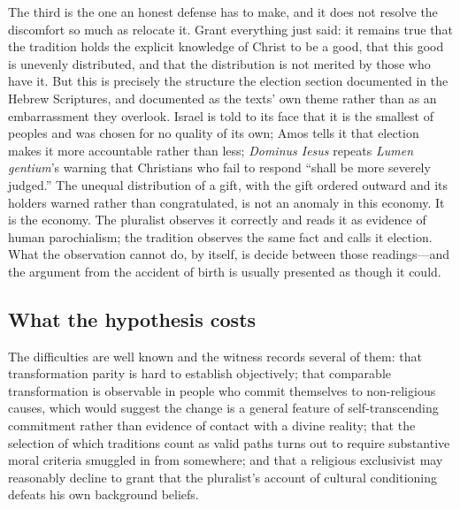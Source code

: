 The third is the one an honest defense has to make, and it does not resolve the discomfort so much as relocate it. Grant everything just said: it remains true that the tradition holds the explicit knowledge of Christ to be a good, that this good is unevenly distributed, and that the distribution is not merited by those who have it. But this is precisely the structure the election section documented in the Hebrew Scriptures, and documented as the texts' own theme rather than as an embarrassment they overlook. Israel is told to its face that it is the smallest of peoples and was chosen for no quality of its own; Amos tells it that election makes it more accountable rather than less; \emph{Dominus Iesus} repeats \emph{Lumen gentium}'s warning that Christians who fail to respond ``shall be more severely judged.'' The unequal distribution of a gift, with the gift ordered outward and its holders warned rather than congratulated, is not an anomaly in this economy. It is the economy. The pluralist observes it correctly and reads it as evidence of human parochialism; the tradition observes the same fact and calls it election. What the observation cannot do, by itself, is decide between those readings---and the argument from the accident of birth is usually presented as though it could.

\subsection{What the hypothesis costs}

The difficulties are well known and the witness records several of them: that transformation parity is hard to establish objectively; that comparable transformation is observable in people who commit themselves to non-religious causes, which would suggest the change is a general feature of self-transcending commitment rather than evidence of contact with a divine reality; that the selection of which traditions count as valid paths turns out to require substantive moral criteria smuggled in from somewhere; and that a religious exclusivist may reasonably decline to grant that the pluralist's account of cultural conditioning defeats his own background beliefs.

